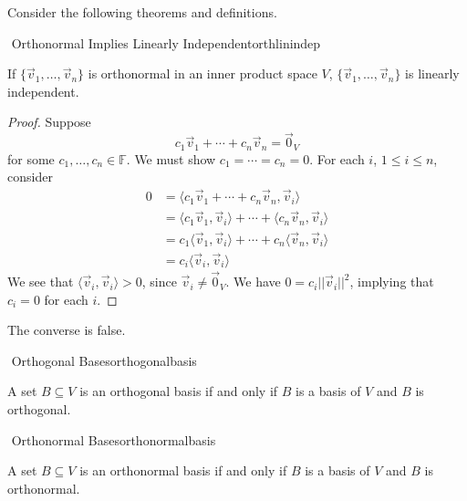         Consider the following theorems and definitions.
        \begin{theorem}{\Stop\,\,Orthonormal Implies Linearly Independent}{orthlinindep}
            
            If \(\{\vec{v}_1,\ldots,\vec{v}_n\}\) is orthonormal in an inner product space \(V\), \(\{\vec{v}_1,\ldots,\vec{v}_n\}\) is linearly independent.
            \begin{proof}
                Suppose
                \begin{equation*}
                    c_1\vec{v}_1+\cdots+c_n\vec{v}_n=\vec{0}_V
                \end{equation*}
                for some \(c_1,\ldots,c_n\in\mathbb{F}\). We must show \(c_1=\cdots=c_n=0\). For each \(i\), \(1\leq i\leq n\), consider 
                \begin{align*}
                    0&=\langle c_1\vec{v}_1+\cdots+c_n\vec{v}_n,\vec{v}_i \rangle \\
                    &=\langle c_1\vec{v}_1,\vec{v}_i\rangle+\cdots+\langle c_n\vec{v}_n,\vec{v}_i\rangle \\
                    &=c_1\langle \vec{v}_1,\vec{v}_i\rangle+\cdots+c_n\langle \vec{v}_n,\vec{v}_i\rangle \\
                    &=c_i\langle \vec{v}_i,\vec{v}_i\rangle
                \end{align*}
                We see that \(\langle\vec{v}_i,\vec{v}_i\rangle>0\), since \(\vec{v}_i\neq\vec{0}_V\). We have \(0=c_i||\vec{v}_i||^2\), implying that \(c_i=0\) for each \(i\).
            \end{proof}
            The converse is false.

        \end{theorem}
        \begin{definition}{\Stop\,\,Orthogonal Bases}{orthogonalbasis}

            A set \(B\subseteq V\) is an orthogonal basis if and only if \(B\) is a basis of \(V\) and \(B\) is orthogonal.
            
        \end{definition}
        \begin{definition}{\Stop\,\,Orthonormal Bases}{orthonormalbasis}

            A set \(B\subseteq V\) is an orthonormal basis if and only if \(B\) is a basis of \(V\) and \(B\) is orthonormal.
            
        \end{definition}
